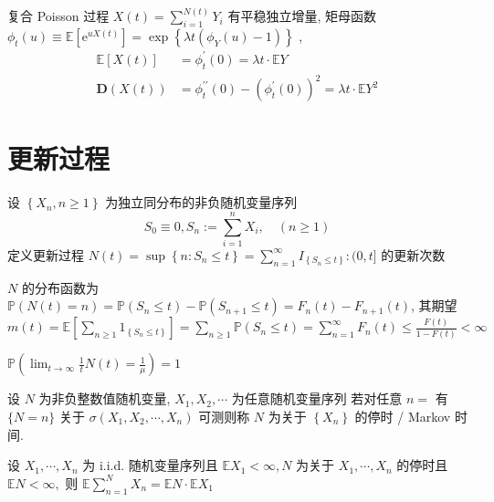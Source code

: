 \documentclass[10pt]{yerbaformat}
\begin{document}
\begin{theorem}
    复合 Poisson 过程 $X(t)=\sum_{i=1}^{N(t)} Y_{i}$ 有平稳独立增量, 矩母函数 $\phi_{t}(u) \equiv \mathbb{E}\left[\mathrm{e}^{u X(t)}\right]=\exp \left\{\lambda t\left(\phi_{Y}(u)-1\right)\right\}$ , $$\begin{aligned} \mathbb{E}[X(t)] &=\phi_{t}^{\prime}(0)=\lambda t \cdot \mathbb{E} Y \\ \mathbf{D}(X(t)) &=\phi_{t}^{\prime \prime}(0)-\left(\phi_{t}^{\prime}(0)\right)^{2}=\lambda t \cdot \mathbb{E} Y^{2} \end{aligned}$$
\end{theorem}


\section{更新过程}
\begin{definition}
    设 $\left\{X_{n}, n \geq 1\right\}$ 为独立同分布的非负随机变量序列
    $$
        S_{0} \equiv 0, S_{n}:=\sum_{i=1}^{n} X_{i}, \quad(n \geq 1)
    $$
    定义更新过程 $N(t)=\sup \left\{n: S_{n} \leq t\right\}=\sum_{n=1}^{\infty} I_{\left\{S_{n} \leq t\right\}}:(0, t]$ 的更新次数
\end{definition}

\par $N$ 的分布函数为 $\mathbb{P}(N(t)=n)=\mathbb{P}\left(S_{n} \leq t\right)-\mathbb{P}\left(S_{n+1} \leq t\right)=F_{n}(t)-F_{n+1}(t)$, 其期望 $m(t)=\mathbb{E}\left[\sum_{n \geq 1} 1_{\left\{S_{n} \leq t\right\}}\right]=\sum_{n \geq 1} \mathbb{P}\left(S_{n} \leq t\right)=\sum_{n=1}^{\infty} F_{n}(t)\leq \frac{F(t)}{1-F(t)}<\infty$

\begin{theorem}[趋近无穷速度]
    $\mathbb{P}\left(\lim _{t \rightarrow \infty} \frac{1}{t} N(t)=\frac{1}{\mu}\right)=1$
\end{theorem}

\begin{definition}[离散型停时]
    设 $N$ 为非负整数值随机变量, $X_{1}, X_{2}, \cdots$ 为任意随机变量序列 若对任意 $n=$ 有 $\{N=n\}$ 关于 $\sigma\left(X_{1}, X_{2}, \cdots, X_{n}\right)$ 可测则称 $N$ 为关于 $\left\{X_{n}\right\}$ 的停时 / Markov 时间.
\end{definition}

\begin{theorem}[Wald 等式]
    设 $X_{1}, \cdots, X_{n}$ 为 i.i.d. 随机变量序列且 $\mathbb{E} X_{1}<\infty, N$ 为关于 $X_{1}, \cdots, X_{n}$ 的停时且 $\mathbb{E} N<\infty,$ 则 $\mathbb{E} \sum_{n=1}^{N} X_{n}=\mathbb{E} N \cdot \mathbb{E} X_{1}$
\end{theorem}
\end{document}
